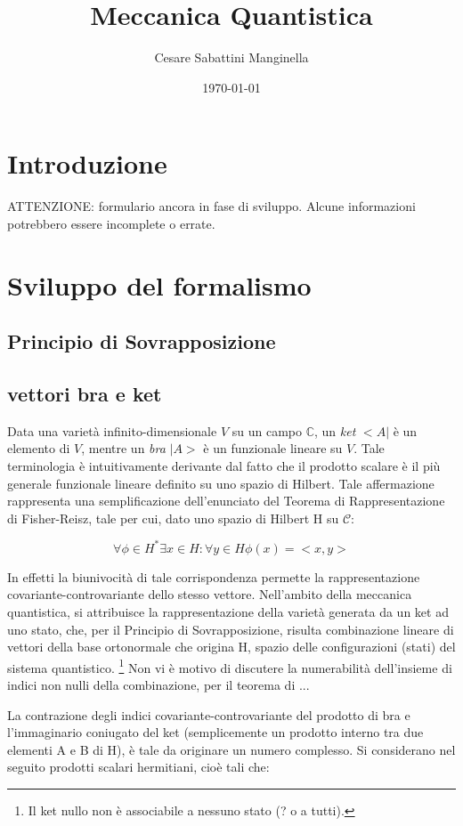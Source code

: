 \documentclass{article}
\title{Meccanica Quantistica}
\author{Cesare Sabattini Manginella}
\date{\today}
\begin{document}
\maketitle
\section{Introduzione}
ATTENZIONE: formulario ancora in fase di sviluppo. Alcune informazioni potrebbero essere incomplete o errate.

\section{Sviluppo del formalismo}

\subsection{Principio di Sovrapposizione}
\subsection{vettori bra e ket}
Data una varietà infinito-dimensionale $V$ su un campo $\mathbb{C}$, un \emph{ket} $<A|$ è un elemento di $V$, mentre un \emph{bra} $|A>$ è un funzionale lineare su $V$.
Tale terminologia è intuitivamente derivante dal fatto che il prodotto scalare è il più generale funzionale lineare definito su uno spazio di Hilbert.
Tale affermazione rappresenta una semplificazione dell'enunciato del Teorema di Rappresentazione di Fisher-Reisz, tale per cui, dato uno spazio di Hilbert H su $\mathcal{C}$:

\begin{equation}
    \forall \phi \in H^* \exists x \in H : \forall y \in H \phi(x)=<x,y>
\end{equation}

In effetti la biunivocità di tale corrispondenza permette la rappresentazione covariante-controvariante dello stesso vettore.
Nell'ambito della meccanica quantistica, si attribuisce la rappresentazione della varietà generata da un ket ad uno stato, che, per il Principio di Sovrapposizione,
risulta combinazione lineare di vettori della base ortonormale che origina H, spazio delle configurazioni (stati) del sistema quantistico.
\footnote[2]{
    Il ket nullo non è associabile a nessuno stato (? o a tutti).
}
Non vi è motivo di discutere la numerabilità dell'insieme di indici non nulli della combinazione, per il teorema di ...

La contrazione degli indici covariante-controvariante del prodotto di bra e l'immaginario coniugato del ket (semplicemente un prodotto interno tra due elementi A e B di H),
è tale da originare un numero complesso.
Si considerano nel seguito prodotti scalari hermitiani, cioè tali che:
\end{document}
